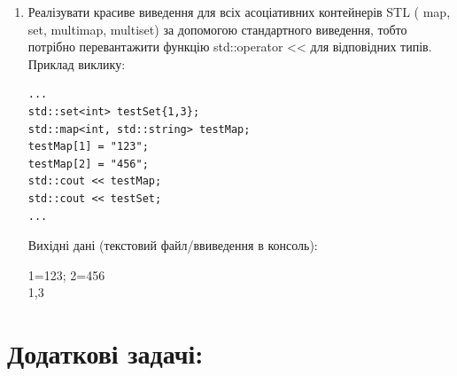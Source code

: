 \documentclass[a5paper,titlepage,openany,twoside,draft]{book_unv}%
\begin{document}
\begin{enumerate}
\item
Реалізувати красиве виведення для всіх асоціативних контейнерів STL
( map, set, multimap, multiset) за допомогою стандартного виведення, 
тобто потрібно перевантажити функцію std::operator \textless{}\textless{} 
для відповідних типів. Приклад виклику: 
\begin{verbatim}
...
std::set<int> testSet{1,3};
std::map<int, std::string> testMap;
testMap[1] = "123";
testMap[2] = "456";
std::cout << testMap;
std::cout << testSet;
...
\end{verbatim}
Вихідні дані (текстовий файл/ввиведення в консоль):

1=123; 2=456\\
1,3
\end{enumerate}

\section{Додаткові задачі:}
\end{document}
